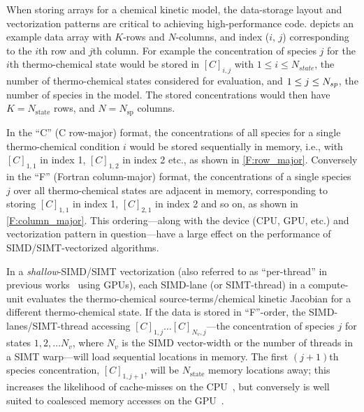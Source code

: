 \documentclass[12pt,number,sort&compress,preprint]{elsarticle}
\begin{document}
When storing arrays for a chemical kinetic model, the data-storage layout and vectorization patterns are critical to achieving high-performance code.
 depicts an example data array with $K$-rows and $N$-columns, and index ($i$, $j$) corresponding to the $i$th row and $j$th column.
For example the concentration of species $j$ for the $i$th thermo-chemical state would be stored in $[C]_{i, j}$ with $1 \le i \le N_{state}$, the number of thermo-chemical states considered for evaluation, and $1 \le j \le \ns/$, the number of species in the model.
The stored concentrations would then have $K = N_{\text{state}}$ rows, and $N = N_{\text{sp}}$ columns.

In the ``C'' (C row-major) format, the concentrations of all species for a single thermo-chemical condition $i$ would be stored sequentially in memory, i.e., with  $[C]_{1, 1}$ in index \num{1}, $[C]_{1, 2}$ in index \num{2} etc., as shown in \cref{F:row_major}.
Conversely in the ``F'' (Fortran column-major) format, the concentrations of a single species $j$ over all thermo-chemical states are adjacent in memory, corresponding to storing $[C]_{1, 1}$ in index \num{1}, $[C]_{2, 1}$ in index \num{2} and so on, as shown in \cref{F:column_major}.
This ordering---along with the device (CPU, GPU, etc.\@) and vectorization pattern in question---have a large effect on the performance of SIMD\slash SIMT-vectorized algorithms.

In a \textit{shallow}-SIMD\slash SIMT vectorization (also referred to as ``per-thread'' in previous works~\cite{Stone:2013aa} using GPUs), each SIMD-lane (or SIMT-thread) in a compute-unit evaluates the thermo-chemical source-terms\slash chemical kinetic Jacobian for a different thermo-chemical state.
If the data is stored in ``F''-order, the SIMD-lanes\slash SIMT-thread accessing $[C]_{1, j}\ldots[C]_{N_v, j}$---the concentration of species $j$ for states $1, 2,\ldots N_v$, where $N_v$ is the SIMD vector-width or the number of threads in a SIMT warp---will load sequential locations in memory.
The first $(j+1)$th species concentration, $[C]_{1, j+1}$, will be $N_{\text{state}}$ memory locations away; this increases the likelihood of cache-misses on the CPU~\cite{gray2000rules}, but conversely is well suited to coalesced memory accesses on the GPU~\cite{NVIDIA:2018}.
\end{document}
